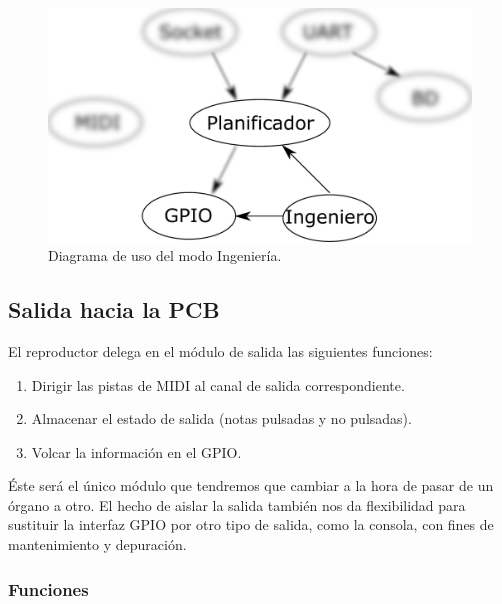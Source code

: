 \begin{figure}[H]
	\noindent \begin{centering}
		\includegraphics[width=\linewidth/2]{capitulo4/daemon_engineer}
		\par\end{centering}
	\smallskip
	\caption{\label{fig:daemon_engineer} Diagrama de uso del modo Ingeniería.}
\end{figure} 

\smallskip

\subsection{Salida hacia la PCB}
\label{subsec:output}

El reproductor delega en el módulo de salida las siguientes funciones:

\begin{enumerate}
	\item Dirigir las pistas de \acrshort{MIDI} al canal de salida correspondiente.
	\item Almacenar el estado de salida (notas pulsadas y no pulsadas).
	\item Volcar la información en el \acrshort{GPIO}.
\end{enumerate}

Éste será el único módulo que tendremos que cambiar a la hora de pasar de un órgano a otro. El hecho de aislar la salida también nos da flexibilidad para sustituir la interfaz \acrshort{GPIO} por otro tipo de salida, como la consola, con fines de mantenimiento y depuración.

\subsubsection{Funciones}

